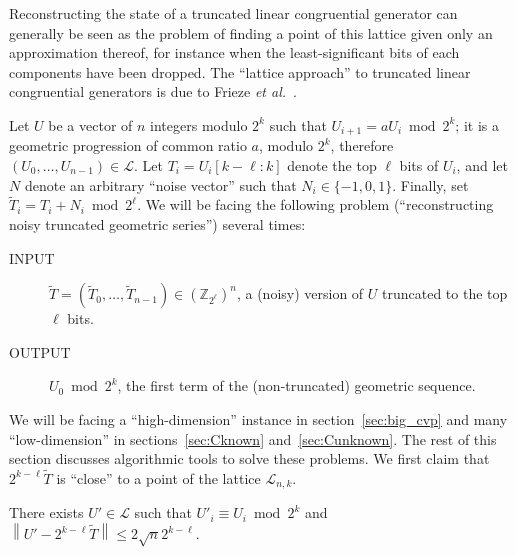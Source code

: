 \documentclass[submission,svgnames,journal=tosc]{iacrtrans}
\begin{document}
Reconstructing the state of a truncated linear congruential generator can
generally be seen as the problem of finding a point of this lattice given only
an approximation thereof, for instance when the least-significant bits of each
components have been dropped. The ``lattice approach'' to truncated linear
congruential generators is due to Frieze \textit{et al.}~\cite{Frieze}.

Let $U$ be a vector of $n$ integers modulo $2^k$ such that
$U_{i+1} = a U_i \bmod 2^k$; it is a geometric progression of common ratio $a$,
modulo $2^k$, therefore $(U_0, \dots, U_{n-1}) \in \mathcal{L}$. Let
$T_i = U_i[k-\ell:k]$ denote the top $\ell$ bits of $U_i$, and let $N$ denote an
arbitrary ``noise vector'' such that $N_i \in \{-1, 0, 1\}$. Finally, set
$\widetilde{T}_i = T_i + N_i \bmod 2^{\ell}$.  We will be facing the following
problem (``reconstructing noisy truncated geometric series'') several times:
\begin{description}
\item[INPUT]  $\widetilde{T} = (\widetilde{T}_0, \dots, \widetilde{T}_{n-1}) \in \left(\mathbb{Z}_{2^\ell}\right)^n$, a (noisy) version of $U$ truncated to the top $\ell$ bits.
\item[OUTPUT] $U_0 \bmod 2^k$, the first term of the (non-truncated) geometric sequence.
\end{description}

We will be facing a ``high-dimension'' instance in section~\ref{sec:big_cvp}
and many ``low-dimension'' in sections~\ref{sec:Cknown}
and~\ref{sec:Cunknown}. The rest of this section discusses algorithmic tools to
solve these problems. We first claim that $2^{k-\ell} \widetilde{T}$ is
``close'' to a point of the lattice $\mathcal{L}_{n,k}$.

\begin{lemma}\label{thm:close}
  There exists $U' \in \mathcal{L}$ such that $U'_i \equiv U_i \bmod 2^k$
  and $\left\lVert U' -2^{k-\ell} \widetilde{T} \right\rVert \leq 2 \sqrt{n} 2^{k-\ell}$.
\end{lemma}
\end{document}
